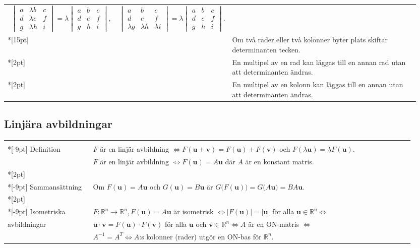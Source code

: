 \documentclass[a4paper]{article}
\let\ent\Leftrightarrow
\def\abs#1{|#1|}
\def\Rone{{\mathbb R}}
\let\R\Rone
\def\vec#1{\mathbf #1} %
\begin{document}
\begin{tabular}{|p{0.2\linewidth}|p{0.75\linewidth}|}
  \ $
  \begin{vmatrix}
    a&\lambda b&c\\d&\lambda e&f\\g&\lambda h&i
  \end{vmatrix}
  =\lambda 
  \begin{vmatrix}
    a&b&c\\d&e&f\\g&h&i
  \end{vmatrix},\quad
  \begin{vmatrix}
    a&b&c\\d&e&f\\\lambda g&\lambda h&\lambda i
  \end{vmatrix}
  =\lambda 
  \begin{vmatrix}
    a&b&c\\d&e&f\\g&h&i
  \end{vmatrix}.
  $\\*[15pt]
  &Om två rader eller två kolonner byter plats skiftar determinanten
  tecken.
  \\*[2pt]
  &En multipel av en rad kan läggas till en annan rad utan att determinanten ändras.
  \\*[2pt]
  &En multipel av en kolonn kan läggas till en annan utan att determinanten ändras.
\\
  \hline
\end{tabular}

\subsection*{Linjära avbildningar}

\begin{tabular}{|p{0.2\linewidth}|p{0.75\linewidth}|}
  \hline\\*[-9pt]
  Definition&$F$ är en linjär avbildning $\ent F(\vec u+\vec
  v)=F(\vec u)+F(\vec v)$ och $F(\lambda\vec u)=\lambda F(\vec u)$.\\
  &$F$ är en linjär avbildning $\ent F(\vec u)=A\vec u$ där $A$ är en
  konstant matris.
  \\*[2pt] \hline\\*[-9pt]
  Sammansättning&Om $F(\vec u)=A\vec u$ och
  $G(\vec u)=B\vec u$ är
  $G\bigl(F(\vec u)\bigr)
  =G\bigl(A\vec u\bigr)
  =BA\vec u
  $.
  \\*[2pt] \hline\\*[-9pt]
  Isometriska&$F:\R^n\to\R^n,F(\vec u)=A\vec u$ är isometrisk $\ent
  \abs{F(\vec u)}=\abs{\vec u}$ för alla $\vec u\in\R^n\ent$\\
  avbildningar&$\vec u\cdot\vec v=F(\vec u)\cdot
  F(\vec v)$ för alla $\vec u$ och $\vec v\in\R^n\ent A$ är en ON-matris 
  $\ent$\\ 
  &$A^{-1}=A^T\ent A$:s kolonner (rader) utgör en ON-bas för $\R^n$.\\
  \hline
\end{tabular}
\end{document}
